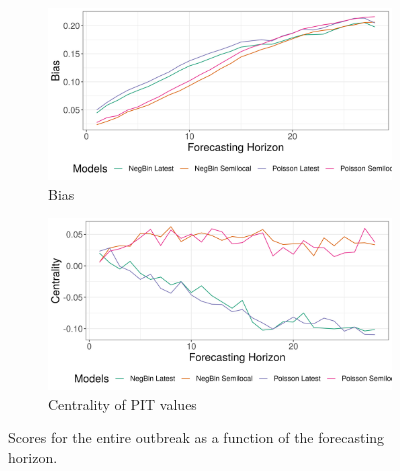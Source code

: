 \begin{figure}[H]
\begin{subfigure}{0.5\textwidth}
  \centering
  \includegraphics[width=\linewidth]{../output/Musienene_bias.png}  
  \caption{Bias}
  \label{fig:sub-third}
\end{subfigure}
\begin{subfigure}{0.5\textwidth}
  \centering
  \includegraphics[width=\linewidth]{../output/Musienene_centrality.png}  
  \caption{Centrality of PIT values}
  \label{fig:nat_scores_4}
\end{subfigure}
  \caption{Scores for the entire outbreak as a function of the forecasting horizon.}

  \label{fig:nat_scores}
\end{figure}

